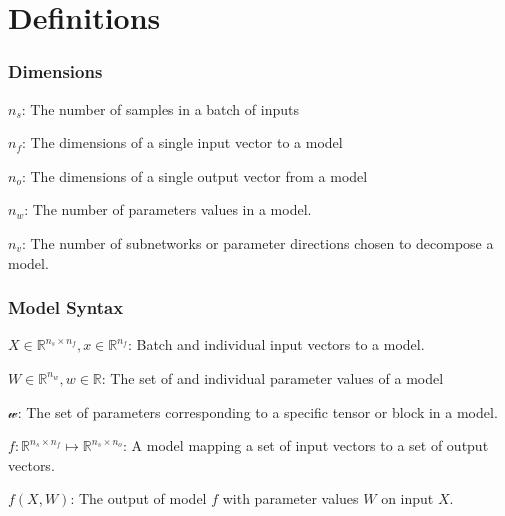 \documentclass{article}
\theoremstyle{plain}
\theoremstyle{definition}
\theoremstyle{remark}
\begin{document}

\clearpage




\newpage
\appendix
\renewcommand{\thefigure}{S\arabic{figure}}  %
\renewcommand{\theHfigure}{S\arabic{figure}} %
\setcounter{figure}{0}  %
\onecolumn


\section{Definitions}

\subsubsection{Dimensions}
$n_s$: The number of samples in a batch of inputs 

$n_f$: The dimensions of a single input vector to a model

$n_o$: The dimensions of a single output vector from a model

$n_w$: The number of parameters values in a model.

$n_v$: The number of subnetworks or parameter directions chosen to decompose a model. 


\subsubsection{Model Syntax}
$X \in \mathbb{R}^{n_s \times n_f}, x \in \mathbb{R}^{n_f}$: Batch and individual input vectors to a model.

$W \in \mathbb{R}^{n_w}, w \in \mathbb{R}$: The set of and individual parameter values of a model

$\mathcal{w}$: The set of parameters corresponding to a specific tensor or block in a model.

$f: \mathbb{R}^{n_s \times n_f} \mapsto \mathbb{R}^{n_s \times n_o}$: A model mapping a set of input vectors to a set of output vectors.

$f(X, W)$: The output of model $f$ with parameter values $W$ on input $X$.
\end{document}
